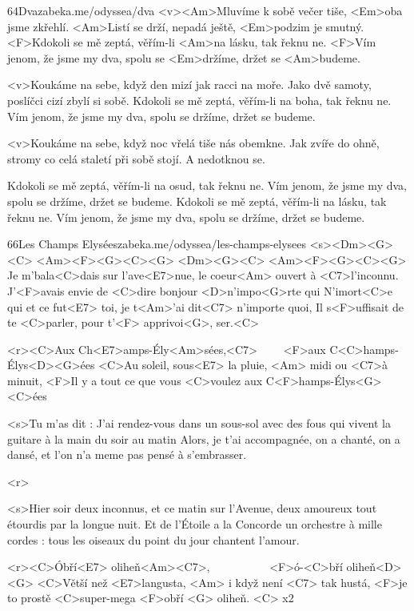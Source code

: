 \begin{song}[Zrní]{64}{Dva}{zabeka.me/odyssea/dva}
	<v><Am>Mluvíme k sobě večer tiše,
	<Em>oba jsme zkřehlí.
	<Am>Listí se drží, nepadá ještě,
	<Em>podzim je smutný.
	<F>Kdokoli se mě zeptá, věřím-li <Am>na lásku, tak řeknu ne.
	<F>Vím jenom, že jsme my dva, spolu se <Em>držíme,
	držet se <Am>budeme.

	<v>Koukáme na sebe, když den mizí
	jak racci na moře.
	Jako dvě samoty, poslíčci cizí
	zbylí si sobě.
	Kdokoli se mě zeptá, věřím-li na boha, tak řeknu ne.
	Vím jenom, že jsme my dva, spolu se držíme,
	držet se budeme.

	<v>Koukáme na sebe, když noc vřelá
	tiše nás obemkne.
	Jak zvíře do ohně, stromy co celá
	staletí při sobě stojí.
	A nedotknou se.

	Kdokoli se mě zeptá, věřím-li na osud, tak řeknu ne.
	Vím jenom, že jsme my dva, spolu se držíme,
	držet se budeme.
	Kdokoli se mě zeptá, věřím-li na lásku, tak řeknu ne.
	Vím jenom, že jsme my dva, spolu se držíme,
	držet se budeme.
\end{song}
\begin{song}{66}{Les Champs Elysées}{zabeka.me/odyssea/les-champs-elysees}
	<s><Dm><G><C> <Am><F><G><C><G>
	<Dm><G><C> <Am><F><G><C><G>
	Je m'bala<C>dais sur l'ave<E7>nue, le coeur<Am> ouvert à <C7>l'inconnu.
	J'<F>avais envie de <C>dire bonjour <D>n'impo<G>rte qui
	N'imort<C>e qui et ce fut<E7> toi, je t<Am>'ai dit<C7> n'importe quoi,
	Il s<F>uffisait de te <C>parler, pour t'<F> apprivoi<G>, ser.<C>

	<r><C>Aux Ch<E7>amps-Ély<Am>sées,<C7> \ \ \ \ <F>aux C<C>hamps-Élys<D><G>ées
	<C>Au soleil, sous<E7> la pluie, <Am> midi ou <C7>à minuit,
	<F>Il y a tout ce que vous <C>voulez aux C<F>hamps-Élys<G><C>ées

	<s>Tu m'as dit : J'ai rendez-vous
	dans un sous-sol avec des fous
	qui vivent la guitare à la main
	du soir au matin
	Alors, je t'ai accompagnée,
	on a chanté, on a dansé,
	et l'on n'a meme pas pensé
	à s'embrasser.

	<r>

	<s>Hier soir deux inconnus,
	et ce matin sur l'Avenue,
	deux amoureux tout étourdis
	par la longue nuit.
	Et de l'Étoile a la Concorde
	un orchestre à mille cordes :
	tous les oiseaux du point du jour
	chantent l'amour.

	<r><C>Óbří<E7> oliheň<Am><C7>, \ \ \ \ \ \ \ \ \ \ <F>ó-<C>bří oliheň<D><G>
	<C>Větší než <E7>langusta, <Am> i když není <C7> tak hustá,
	<F>je to prostě <C>super-mega <F>obří <G> oliheň. <C> x2
\end{song}
